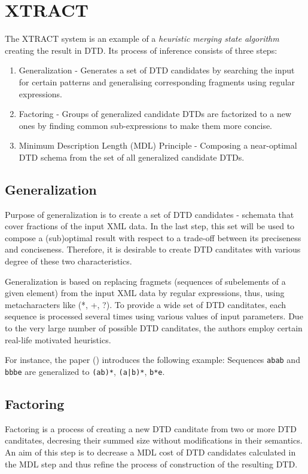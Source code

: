 \section{XTRACT}
The XTRACT \cite{Garofalakis:2000:XSE:342009.335409} system is an example of a \emph{heuristic} \emph{merging state algorithm} creating the result in DTD. Its process of inference consists of three steps:
\begin{enumerate}
\item Generalization - Generates a set of DTD candidates by searching the input for certain patterns and generalising corresponding fragments using regular expressions.
\item Factoring - Groups of generalized candidate DTDs are factorized to a new ones by finding common sub-expressions to make them more concise.
\item Minimum Description Length (MDL) Principle - Composing a near-optimal DTD schema from the set of all generalized candidate DTDs.
\end{enumerate}

\subsection{Generalization}
Purpose of generalization is to create a set of DTD candidates - schemata that cover fractions of the input XML data. In the last step, this set will be used to compose a (sub)optimal result with respect to a trade-off between its preciseness and conciseness. Therefore, it is desirable to create DTD canditates with various degree of these two characteristics.

Generalization is based on replacing fragmets (sequences of subelements of a given element) from the input XML data by regular expressions, thus, using metacharacters like (*, +, ?). To provide a wide set of DTD canditates, each sequence is processed several times using various values of input parameters. Due to the very large number of possible DTD canditates, the authors employ certain real-life motivated heuristics.

For instance, the paper (\cite{Garofalakis:2000:XSE:342009.335409}) introduces the following example: Sequences \texttt{abab} and \texttt{bbbe} are generalized to \texttt{(ab)*}, \texttt{(a|b)*}, \texttt{b*e}.

\subsection{Factoring}
Factoring is a process of creating a new DTD canditate from two or more DTD canditates, decresing their summed size without modifications in their semantics. An aim of this step is to decrease a MDL cost of DTD candidates calculated in the MDL step and thus refine the process of construction of the resulting DTD.

